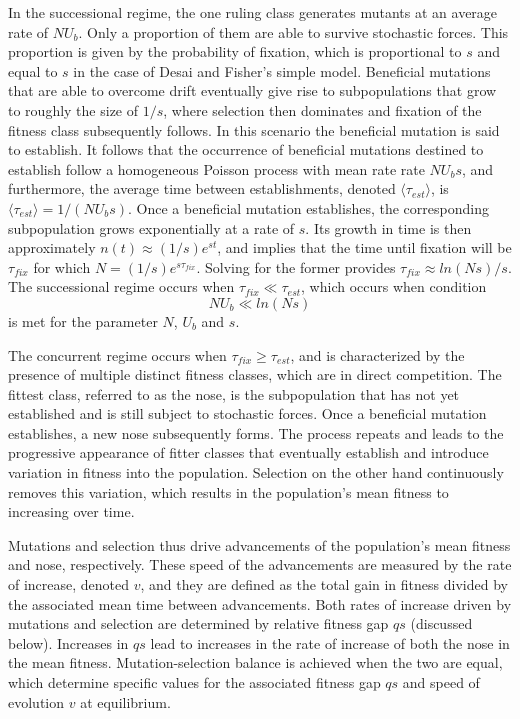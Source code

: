 \documentclass[12pt,twocolumn]{article}
\begin{document}
In the successional regime, the one ruling class generates mutants at an average rate of $N U_b$.  Only a proportion of them are able to survive stochastic forces.  This proportion is given by the probability of fixation, which is proportional to $s$ and equal to $s$ in the case of Desai and Fisher's simple model.  Beneficial mutations that are able to overcome drift eventually give rise to subpopulations that grow to roughly the size of $1/s$, where selection then dominates and fixation of the fitness class subsequently follows.  In this scenario the beneficial mutation is said to establish.  It follows that the occurrence of beneficial mutations destined to establish follow a homogeneous Poisson process with mean rate rate $NU_b s$, and furthermore, the average time between establishments, denoted $\langle \tau_{est} \rangle$, is $\langle \tau_{est} \rangle = 1/(N U_b s)$.  Once a beneficial mutation establishes, the corresponding subpopulation grows exponentially at a rate of $s$.  Its growth in time is then approximately $n(t)\approx (1/s) e^{st}$, and implies that the time until fixation will be $\tau_{fix}$ for which $N =(1/s)e^{s \tau_{fix}}$.  Solving for the former provides $\tau_{fix} \approx ln(Ns)/s$.  The successional regime occurs when $\tau_{fix} \ll \tau_{est}$, which occurs when condition
\[ N U_b \ll ln(Ns) \] 
is met for the parameter $N$, $U_b$ and $s$. 

The concurrent regime occurs when $\tau_{fix} \ge \tau_{est}$, and is characterized by the presence of multiple distinct fitness classes, which are in direct competition.  The fittest class, referred to as the nose, is the subpopulation that has not yet established and is still subject to stochastic forces.  Once a beneficial mutation establishes, a new nose subsequently forms.  The process repeats and leads to the progressive appearance of fitter classes that eventually establish and introduce variation in fitness into the population.  Selection on the other hand continuously removes this variation, which results in the population's mean fitness to increasing over time.  

Mutations and selection thus drive advancements of the population's mean fitness and nose, respectively.  These speed of the advancements are measured by the rate of increase, denoted $v$, and they are defined as the total gain in fitness divided by the associated mean time between advancements.  Both rates of increase driven by mutations and selection are determined by relative fitness gap $qs$ (discussed below).  Increases in $qs$ lead to increases in the rate of increase of both the nose in the mean fitness.  Mutation-selection balance is achieved when the two are equal, which determine specific values for the associated fitness gap $qs$ and speed of evolution $v$ at equilibrium. 
\end{document}
